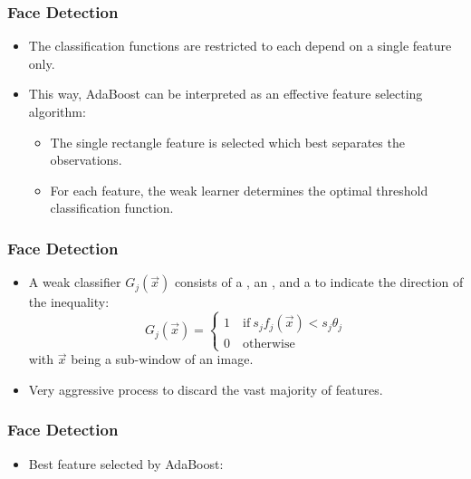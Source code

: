 \begin{frame}
  \frametitle{Face Detection \cont}


  \begin{itemize}
    \item The classification functions are restricted to each depend on a single feature only. %
    \item This way, AdaBoost can be interpreted as an effective feature selecting algorithm:
      \begin{itemize}
        \item The single rectangle feature is selected which best separates the observations. %
        \item For each feature, the weak learner determines the optimal threshold classification function.
      \end{itemize}
  \end{itemize}
\end{frame}


\begin{frame}
  \frametitle{Face Detection \cont}

  \begin{itemize}
    \item A weak classifier $G_j(\vec x)$ consists of a , an , and a  to indicate the direction of the inequality:
      \begin{displaymath}
        G_j(\vec x) = \begin{cases}
                        1 \quad \mbox{if} ~s_j f_j(\vec x) < s_j \theta_j \\
                        0 \quad \mbox{otherwise}
                      \end{cases}
      \end{displaymath}
      with $\vec x$ being a sub-window of an image.
      \pspread
    \item Very aggressive process to discard the vast majority of features.
  \end{itemize}
\end{frame}


\begin{frame}
  \frametitle{Face Detection \cont}

  \begin{itemize}
    \item Best feature selected by AdaBoost:
  \end{itemize}

  \begin{center}
    \begin{figure}
  \end{figure}
  \end{center}
\end{frame}


